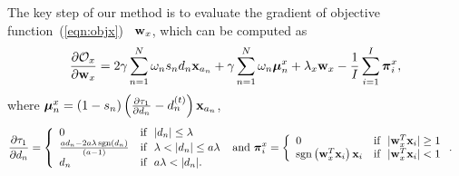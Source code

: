 


The key step of our method is to evaluate the gradient of objective function~(\ref{eqn:objx}) \wrt~${\bf w}_{x}$, which can be computed as
\begin{align}
\frac{\partial \mathcal{O}_{x}}{\partial {\bf w}_{x} }=2\gamma\sum\limits_{n=1}^{N}\omega_{n}s_{n}d_{n}{\bf x}_{a_n}+\gamma\sum\limits_{n=1}^{N}\omega_{n}\mbox{\boldmath$\mu$\unboldmath}_{n}^{x}+\lambda_{x}{\bf w}_{x}- \frac{1}{I}\sum\limits_{i=1}^{I}\mbox{\boldmath$\pi$\unboldmath}^{x}_{i},
\end{align}
where $\mbox{\boldmath$\mu$\unboldmath}_{n}^{x}=(1-s_{n}) \left(\frac{\partial \tau_1}{\partial d_{n}}-{d}^{(t)}_{n}\right){\bf x}_{a_n} $,
\begin{align}
\frac{\partial \tau_1}{\partial d_{n}} & =\left\{ \begin{array}{ll}
         0 & \mbox{if ~} |d_{n}| \le \lambda \\
         \frac{ad_{n}-2a\lambda\sgn(d_{n})}{(a-1)}& \mbox{if ~}\lambda < |d_{n}|\le a\lambda\\
         d_{n} & \mbox{if ~}a\lambda<|d_{n}|.\nonumber
                          \end{array} \right.\ \mbox{and} \ 
                          \pii^{x}_{i}=\left\{ \begin{array}{ll}
                                0 & \mbox{if ~}|\w_{x}^{T}\x_{i}| \ge 1 \\
                                \sgn\left(\w^{T}_{x}\x_{i}\right)\x_{i}& \mbox{if ~} |\w_{x}^{T}\x_{i}|<1\nonumber
                                                 \end{array} \right..
\end{align}

